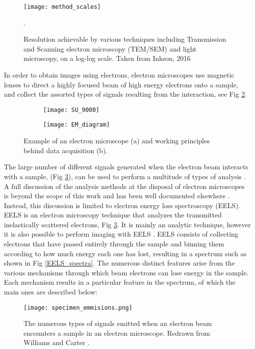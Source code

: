 \begin{figure}
	\centering
	\texttt{[image: method\_scales]}
	\caption{Resolution achievable by various techniques including Transmission and Scanning electron microscopy (TEM/SEM) and light microscopy, on a log-log scale.  Taken from Inkson, 2016 \cite{inkson_2_2016}}.
	\label{method_scales}
	
\end{figure}


In order to obtain images using electrons, electron microscopes use magnetic lenses to direct a highly focused beam of high energy electrons onto a sample, and collect the assorted types of signals resulting from the interaction, see Fig \ref{em_diagram}.\\


\begin{figure}
\begin{subfigure}{0.45\textwidth}
	\texttt{[image: SU\_9000]}
	\caption{}
\end{subfigure}
\hspace{0.05cm}
\begin{subfigure}{0.45\textwidth}
	\texttt{[image: EM\_diagram]}
	\caption{}
\end{subfigure}
	\caption{Example of an electron microscope (a) and working principles behind data acquisition (b). }
	\label{em_diagram}
\end{figure}

The large number of different signals generated when the electron beam interacts with a sample, (Fig \ref{specimen_emmisions}), can be used to perform a multitude of types of analysis \cite{williams_transmission_2008}.  A full discussion of the analysis methods at the disposal of electron microscopes is beyond the scope of this work and has been well documented elsewhere \cite{goldstein_electron_2003,Egerton,williams_transmission_2008,reimer_electron_1998}.  Instead, this discussion is limited to electron energy loss spectroscopy (EELS).  EELS is an electron microscopy technique that analyzes the transmitted inelastically scattered electrons, Fig \ref{specimen_emmisions}\cite{Egerton}.  It is mainly an analytic technique, however it is also possible to perform imaging with EELS \cite{varela_stem-eels_2012}.  EELS consists of collecting electrons that have passed entirely through the sample and binning them according to how much energy each one has lost, resulting in a spectrum such as shown in Fig \ref{EELS_spectra}.  The numerous distinct features arise from the various mechanisms through which beam electrons can lose energy in the sample.  Each mechanism results in a particular feature in the spectrum, of which the main ones are described below:
\begin{figure}
	\centering
	\texttt{[image: specimen\_emmisions.png]}
	\caption{The numerous types of signals emitted when an electron beam encounters a sample in an electron microscope.   Redrawn from Williams and Carter \cite{williams_transmission_2008}.  }
	\label{specimen_emmisions}
\end{figure}

